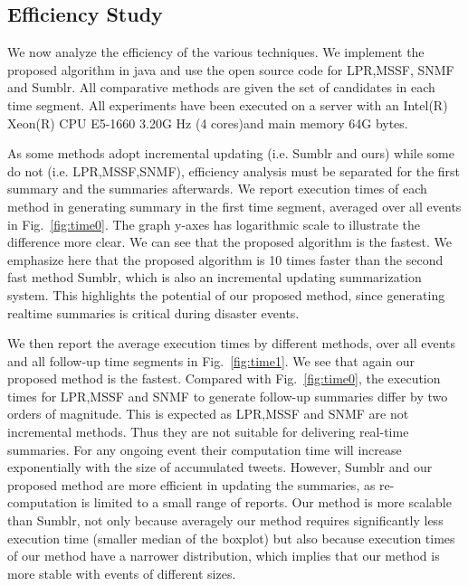 \documentclass[envcountsame]{llncs}
\begin{document}
\subsection{Efficiency Study}
We now analyze the efficiency of the various techniques. We implement the proposed algorithm in java and use the open source code for LPR,MSSF, SNMF and Sumblr. All comparative methods are given the set of candidates in each time segment. All experiments have been executed on a server with an Intel(R) Xeon(R) CPU E5-1660 3.20G Hz (4 cores)and main memory 64G bytes.

As some methods adopt incremental updating (i.e. Sumblr and ours) while some do not (i.e. LPR,MSSF,SNMF), efficiency analysis must be separated for the first summary and the summaries afterwards. We report execution times of each method in generating summary in the first time segment, averaged over all events in Fig.~\ref{fig:time0}. The graph y-axes has logarithmic scale to illustrate the difference more clear. We can see that the proposed algorithm is the fastest. We emphasize here that the proposed algorithm is 10 times faster than the second fast method Sumblr, which is also an incremental updating summarization system.  This highlights the potential of our proposed method, since generating realtime summaries is critical during disaster events.

We then report the average execution times by different methods, over all events and all follow-up time segments in Fig.~\ref{fig:time1}. We see that again our proposed method is the fastest. Compared with Fig.~\ref{fig:time0}, the execution times for LPR,MSSF and SNMF to generate follow-up summaries differ by two orders of magnitude. This is expected as LPR,MSSF and SNMF are not incremental methods. Thus they are not suitable for delivering real-time summaries.  For any ongoing event their computation time will increase exponentially with the size of accumulated tweets. However, Sumblr and our proposed method are more efficient in updating the summaries, as re-computation is limited to a small range of reports. Our method is more scalable than Sumblr, not only because averagely our method requires  significantly less execution time (smaller median of the boxplot) but also  because execution times of our method have a narrower distribution, which implies that our method is more stable with events of different sizes.
\end{document}

